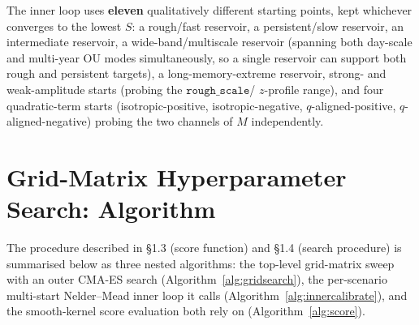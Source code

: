 \documentclass[11pt,a4paper]{article}
\begin{document}
The inner loop uses \textbf{eleven} qualitatively different starting
points, kept whichever converges to the lowest $S$: a rough/fast
reservoir, a persistent/slow reservoir, an intermediate reservoir, a
wide-band/multiscale reservoir (spanning both day-scale and
multi-year OU modes simultaneously, so a single reservoir can support
both rough and persistent targets), a long-memory-extreme reservoir,
strong- and weak-amplitude starts (probing the $\texttt{rough\_scale}$/
$z$-profile range), and four quadratic-term starts (isotropic-positive,
isotropic-negative, $q$-aligned-positive, $q$-aligned-negative) probing
the two channels of $M$ independently.



\section{Grid-Matrix Hyperparameter Search: Algorithm}

The procedure described in \S1.3 (score function) and \S1.4 (search
procedure) is summarised below as three nested algorithms: the
top-level grid-matrix sweep with an outer CMA-ES search
(Algorithm~\ref{alg:gridsearch}), the per-scenario multi-start
Nelder--Mead inner loop it calls (Algorithm~\ref{alg:innercalibrate}),
and the smooth-kernel score evaluation both rely on
(Algorithm~\ref{alg:score}).
\end{document}
